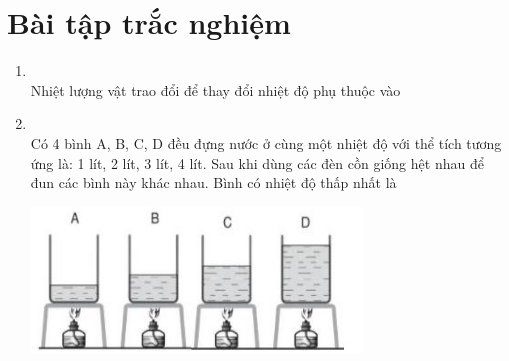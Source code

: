 \let\lesson\undefined
\newcommand{\lesson}{\phantomlesson{Bài 4.}}


\setcounter{section}{2}
\section{Bài tập trắc nghiệm}
\begin{enumerate}[label=\bfseries Câu \arabic*:, leftmargin=1.7cm]
	\item {}\\
	Nhiệt lượng vật trao đổi để thay đổi nhiệt độ phụ thuộc vào

\item {}\\
Có 4 bình A, B, C, D đều đựng nước ở cùng một nhiệt độ với thể tích tương ứng là: 1 lít, 2 lít, 3 lít, 4 lít. Sau
khi dùng các đèn cồn giống hệt nhau để đun các bình này khác nhau. Bình có nhiệt độ thấp nhất là
\begin{center}
	\includegraphics[width=0.4\linewidth]{../figs/VN12-Y24-PH-SYL-004P-1}
\end{center}


\end{enumerate}
